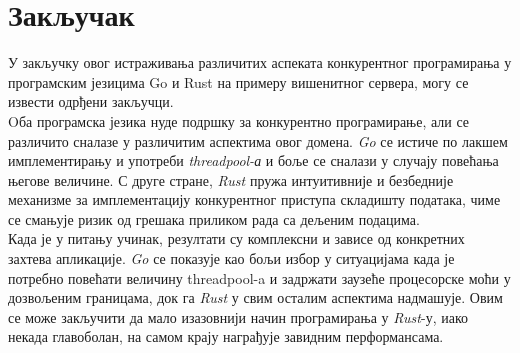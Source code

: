 \section{Закључак}
У закључку овог истраживања различитих аспеката конкурентног програмирања у програмским језицима Go и Rust на примеру вишенитног сервера, могу се извести одрђени закључци.\\

Oба програмска језика нуде подршку за конкурентно програмирање, али се различито сналазе у различитим аспектима овог домена. \textit{Go} се истиче по лакшем имплементирању и употреби \textit{threadpool-а} и боље се сналази у случају повећања његове величине. С друге стране, \textit{Rust} пружа интуитивније и безбедније механизме за имплементацију конкурентног приступа складишту података, чиме се смањује ризик од грешака приликом рада са дељеним подацима.\\

Када је у питању учинак, резултати су комплексни и зависе од конкретних захтева апликације. \textit{Go} се показује као бољи избор у ситуацијама када је потребно повећати величину threadpool-a и задржати заузеће процесорске моћи у дозвољеним границама, док га \textit{Rust} у свим осталим аспектима надмашује. Овим се може закључити да мало изазовнији начин програмирања у \textit{Rust}-у, иако некада главоболан, на самом крају награђује завидним перформансама.